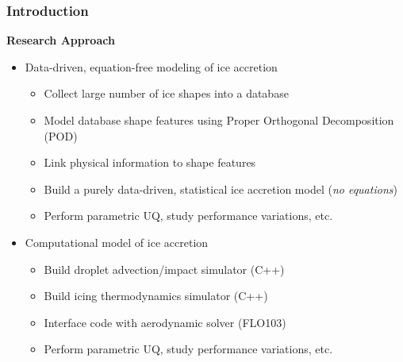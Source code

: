 \documentclass[9pt]{beamer}
\begin{document}
\begin{frame}
\frametitle{Introduction}
\label{sec-1-6}

\textbf{Research Approach}

\begin{itemize}
\item Data-driven, equation-free modeling of ice accretion
\begin{itemize}
\item Collect large number of ice shapes into a database
\item Model database shape features using Proper Orthogonal Decomposition (POD)
\item Link physical information to shape features
\item Build a purely data-driven, statistical ice accretion model (\emph{no equations})
\item Perform parametric UQ, study performance variations, etc.
\end{itemize}
\item Computational model of ice accretion
\begin{itemize}
\item Build droplet advection/impact simulator (C++)
\item Build icing thermodynamics simulator (C++)
\item Interface code with aerodynamic solver (FLO103)
\item Perform parametric UQ, study performance variations, etc.
\end{itemize}
\end{itemize}
\end{frame}
\end{document}

